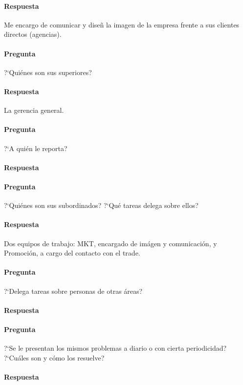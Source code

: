 \documentclass[12pt,a4paper,spanish]{article}
\begin{document}
	\paragraph{Respuesta}
	Me encargo de comunicar y dise\~{n} la imagen de la empresa frente a sus clientes directos (agencias).
	
	\paragraph{Pregunta}
	 ?`Qui\'enes son sus superiores? 
	\paragraph{Respuesta}
	La gerencia general.

	\paragraph{Pregunta}
	 ?`A qui\'en le reporta?
	\paragraph{Respuesta}

	\paragraph{Pregunta}
	 ?`Qui\'enes son sus subordinados?  ?`Qu\'e tareas delega sobre ellos?
	\paragraph{Respuesta}
	Dos equipos de trabajo: MKT, encargado de im\'agen y comunicaci\'on, y Promoci\'on, a cargo del contacto con el trade.

	\paragraph{Pregunta}
	 ?`Delega tareas sobre personas de otras \'areas?
	\paragraph{Respuesta}

	\paragraph{Pregunta}
	 ?`Se le presentan los mismos problemas a diario o con cierta periodicidad?  ?`Cu\'ales son y c\'omo los resuelve?
	\paragraph{Respuesta}
\end{document}
